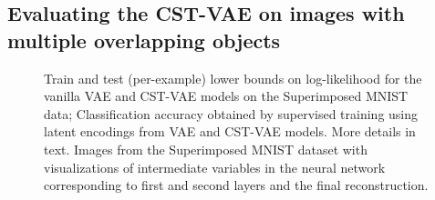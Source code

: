 \vspace{-2mm}
\subsection{Evaluating the CST-VAE on images with multiple overlapping
  objects}
\vspace{-2mm}

\begin{figure}[t]
\begin{center}
\;
\;
\vspace{-4mm}
\end{center}
 \caption{\footnotesize
  Train and test (per-example) lower bounds on log-likelihood 
for the vanilla VAE and CST-VAE models on the Superimposed MNIST data;
 Classification accuracy obtained by supervised training using latent encodings
 from VAE and CST-VAE models.
  More details in text.
   Images from the Superimposed MNIST dataset with visualizations of
 intermediate variables in the neural network corresponding to first and second layers and the final reconstruction.
}
\end{figure}



